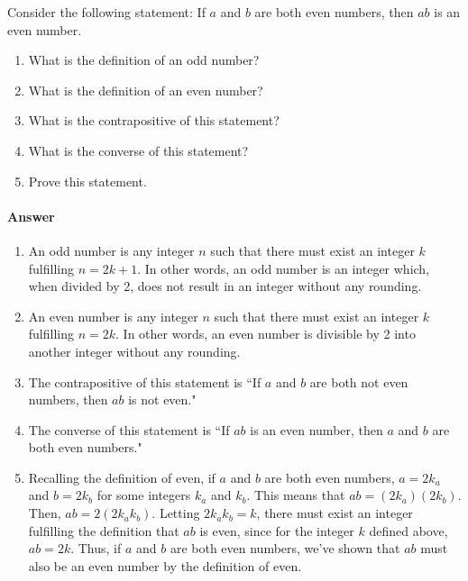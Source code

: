\documentclass{article}
\begin{document}



\nextprob
Consider the following statement: If $a$ and $b$ are both even numbers, then $ab$ is
an even number.
\begin{enumerate}
    \item What is the definition of an odd number?
    \item What is the definition of an even number?
    \item What is the contrapositive of this statement?
    \item What is the converse of this statement?
    \item Prove this statement.
\end{enumerate}

\paragraph{Answer}


\begin{enumerate}
	\item An odd number is any integer $n$ such that there must exist an integer $k$ fulfilling
		$n=2k+1$. In other words, an odd number is an integer which, when divided by 2, does
		not result in an integer without any rounding.
	\item An even number is any integer $n$ such that there must exist an integer $k$ fulfilling
		$n=2k$. In other words, an even number is divisible by 2 into another integer without
		any rounding.
	\item The contrapositive of this statement is ``If $a$ and $b$ are both not even numbers,
		then $ab$ is not even."
	\item The converse of this statement is ``If $ab$ is an even number, then $a$ and $b$ are both 
		even numbers."
	\item Recalling the definition of even, if $a$ and $b$ are both even numbers, $a=2k_a$ and $b=2k_b$
		for some integers $k_a$ and $k_b$. This means that $ab = (2k_a)(2k_b)$. Then, $ab=2(2k_{a}k_{b})$.
		Letting $2k_{a}k_{b}=k$, there must exist an integer fulfilling the definition that
		$ab$ is even, since for the integer $k$ defined above, $ab=2k$. Thus, if $a$ and $b$ are both 
		even numbers, we've shown that $ab$ must also be an even number by the definition of even.
\end{enumerate}

\end{document}
